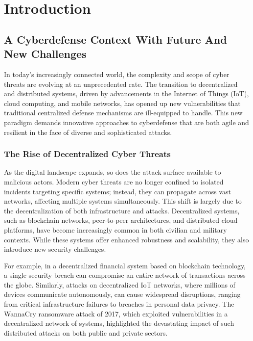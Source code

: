 \chapter{Introduction}\label{ch:introduction}

\section{A Cyberdefense Context With Future And New Challenges}

In today's increasingly connected world, the complexity and scope of cyber threats are evolving at an unprecedented rate. The transition to decentralized and distributed systems, driven by advancements in the Internet of Things (IoT), cloud computing, and mobile networks, has opened up new vulnerabilities that traditional centralized defense mechanisms are ill-equipped to handle. This new paradigm demands innovative approaches to cyberdefense that are both agile and resilient in the face of diverse and sophisticated attacks.

\subsection{The Rise of Decentralized Cyber Threats}

As the digital landscape expands, so does the attack surface available to malicious actors. Modern cyber threats are no longer confined to isolated incidents targeting specific systems; instead, they can propagate across vast networks, affecting multiple systems simultaneously. This shift is largely due to the decentralization of both infrastructure and attacks. Decentralized systems, such as blockchain networks, peer-to-peer architectures, and distributed cloud platforms, have become increasingly common in both civilian and military contexts. While these systems offer enhanced robustness and scalability, they also introduce new security challenges.

For example, in a decentralized financial system based on blockchain technology, a single security breach can compromise an entire network of transactions across the globe. Similarly, attacks on decentralized IoT networks, where millions of devices communicate autonomously, can cause widespread disruptions, ranging from critical infrastructure failures to breaches in personal data privacy. The WannaCry ransomware attack of 2017, which exploited vulnerabilities in a decentralized network of systems, highlighted the devastating impact of such distributed attacks on both public and private sectors.

